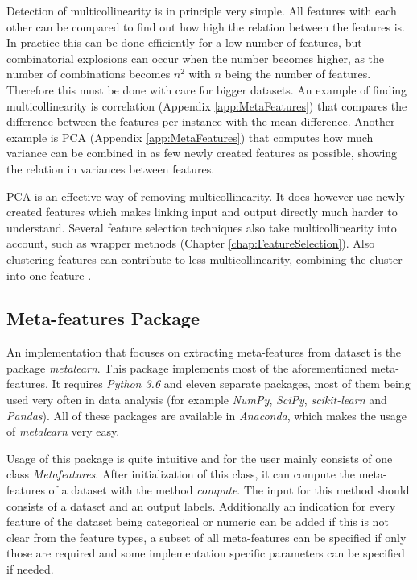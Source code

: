 \documentclass[10pt,a4paper]{report}
\begin{document}
	Detection of multicollinearity is in principle very simple. All features with each other can be compared to find out how high the relation between the features is. In practice this can be done efficiently for a low number of features, but combinatorial explosions can occur when the number becomes higher, as the number of combinations becomes $n^2$ with $n$ being the number of features. Therefore this must be done with care for bigger datasets. An example of finding multicollinearity is correlation (Appendix \ref{app:MetaFeatures}) that compares the difference between the features per instance with the mean difference. Another example is PCA (Appendix \ref{app:MetaFeatures}) that computes how much variance can be combined in as few newly created features as possible, showing the relation in variances between features.
	
	PCA is an effective way of removing multicollinearity. It does however use newly created features which makes linking input and output directly much harder to understand. Several feature selection techniques also take multicollinearity into account, such as wrapper methods (Chapter \ref{chap:FeatureSelection}). Also clustering features can contribute to less multicollinearity, combining the cluster into one feature \cite{rokach2005clustering}.
	
	\subsection{Meta-features Package}
	\label{DEsubsec:MetaFeatures}
	
	An implementation that focuses on extracting meta-features from dataset is the package \textit{metalearn}. This package implements most of the aforementioned meta-features. It requires \textit{Python 3.6} and eleven separate packages, most of them being used very often in data analysis (for example \textit{NumPy}, \textit{SciPy}, \textit{scikit-learn} and \textit{Pandas}). All of these packages are available in \textit{Anaconda}, which makes the usage of \textit{metalearn} very easy.
	
	Usage of this package is quite intuitive and for the user mainly consists of one class \textit{Metafeatures}. After initialization of this class, it can compute the meta-features of a dataset with the method \textit{compute}. The input for this method should consists of a dataset and an output labels. Additionally an indication for every feature of the dataset being categorical or numeric can be added if this is not clear from the feature types, a subset of all meta-features can be specified  if only those are required and some implementation specific parameters can be specified if needed.
	
\end{document}
